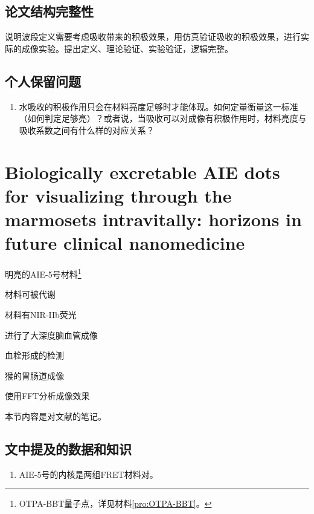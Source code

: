 \documentclass[cn,11pt,chinese]{elegantbook}
\begin{document}
\subsection{论文结构完整性}
说明波段定义需要考虑吸收带来的积极效果，用仿真验证吸收的积极效果，进行实际的成像实验。提出定义、理论验证、实验验证，逻辑完整。

\subsection{个人保留问题}

\begin{enumerate}
  \item 水吸收的积极作用只会在材料亮度足够时才能体现。如何定量衡量这一标准（如何判定足够亮）？或者说，当吸收可以对成像有积极作用时，材料亮度与吸收系数之间有什么样的对应关系？
\end{enumerate}


\section{Biologically excretable AIE dots for visualizing through the marmosets intravitally: horizons in future clinical nanomedicine}

\begin{introduction}[创新点概要]
  \item 明亮的AIE-5号材料\footnote{OTPA-BBT量子点，详见材料\vref{pro:OTPA-BBT}。}
  \item 材料可被代谢
  \item 材料有NIR-IIb荧光
  \item 进行了大深度脑血管成像
  \item 血栓形成的检测
  \item 猴的胃肠道成像
  \item 使用FFT分析成像效果
\end{introduction}
本节内容是对文献\cite{Feng2021}的笔记。

\subsection{文中提及的数据和知识}
\begin{enumerate}
  \item AIE-5号的内核是两组FRET材料对。
\end{enumerate}
\end{document}
